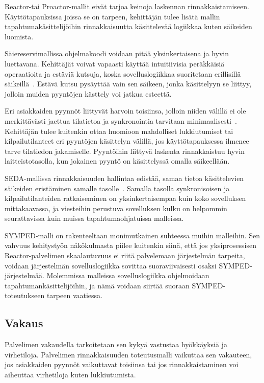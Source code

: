 \documentclass[finnish]{tktltiki2}
\theoremstyle{definition}
\theoremstyle{remark}
\begin{document}
Reactor-tai Proactor-mallit eivät tarjoa keinoja
laskennan rinnakkaistamiseen. Käyttötapauksissa
joissa se on tarpeen, kehittäjän tulee lisätä
mallin tapahtumakäsittelijöihin rinnakkaisuutta käsittelevää
logiikkaa kuten säikeiden luomista.


Säiereservimallissa ohjelmakoodi voidaan pitää yksinkertaisena ja
hyvin luettavana. Kehittäjät voivat vapaasti käyttää intuitiivisia
peräkkäisiä operaatioita ja estäviä kutsuja, koska sovelluslogiikkaa
suoritetaan erillisillä säikeillä~\cite{pyarali_proactor_1997}. Estävä kutsu pysäyttää vain
sen säikeen, jonka käsittelyyn se liittyy, jolloin muiden
pyyntöjen kästtely voi jatkua esteettä.

Eri asiakkaiden pyynnöt liittyvät harvoin toisiinsa,
jolloin niiden välillä ei ole merkittävästi jaettua tilatietoa ja
synkronointia tarvitaan minimaalisesti~\cite{pyarali_proactor_1997}.
Kehittäjän tulee kuitenkin ottaa huomioon mahdolliset lukkiutumiset
tai kilpailutilanteet eri pyyntöjen käsittelyn välillä, jos
käyttötapauksessa ilmenee tarve tilatiedon jakamiselle.
Pyyntöihin liittyvä laskenta rinnakkaistuu hyvin laitteistotasolla,
kun jokainen pyyntö on käsittelyssä omalla säikeellään.

SEDA-mallissa rinnakkaisuuden hallintaa edistää,
samaa tietoa käsittelevien säikeiden eristäminen samalle tasolle~\cite{welsh_seda_2001}.
Samalla tasolla synkronisoisen ja kilpailutilanteiden ratkaiseminen on
yksinkertaisempaa kuin koko sovelluksen mittakaavassa, ja
viesteihin perustuva sovelluksen kulku on helpommin seurattavissa kuin
muissa tapahtumaohjatuissa malleissa.

SYMPED-malli on rakenteeltaan monimutkainen suhteessa muihin malleihin.
Sen vahvuus kehitystyön näkökulmasta piilee kuitenkin siinä, että
jos yksiprosessisen Reactor-palvelimen skaalautuvuus ei riitä palvelemaan
järjestelmän tarpeita, voidaan järjestelmän sovelluslogiikka
sovittaa suoraviivaisesti osaksi SYMPED-järjestelmää. Molemmissa malleissa
sovelluslogiikka ohjelmoidaan tapahtumankäsittelijöihin, ja nämä voidaan siirtää
suoraan SYMPED-toteutukseen tarpeen vaatiessa.

\subsection{Vakaus}
Palvelimen vakaudella tarkoitetaan sen kykyä vastustaa hyökkäyksiä ja 
virhetiloja.
Palvelimen rinnakkaisuuden toteutusmalli vaikuttaa sen vakauteen, jos asiakkaiden
pyynnöt vaikuttavat toisiinsa tai jos rinnakkaistaminen voi aiheuttaa virhetiloja kuten
lukkiutumista.
\end{document}
